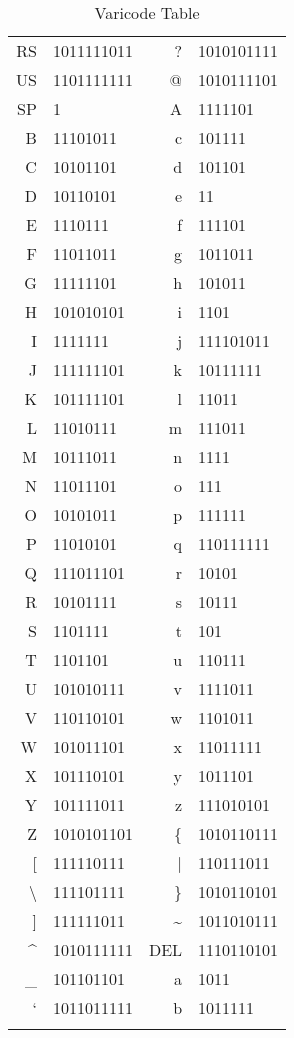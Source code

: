 \begin{longtable}{ r l || r l }
	RS  & 1011111011 				&	?   & 1010101111  \\
	US  & 1101111111 				&	@   & 1010111101  \\
	SP  & 1 						&	A   & 1111101  \\
	B   & 11101011 					&	c   & 101111  \\
	C   & 10101101 					&	d   & 101101  \\
	D   & 10110101 					&	e   & 11  \\
	E   & 1110111 					&	f   & 111101  \\
	F   & 11011011 					&	g   & 1011011  \\
	G   & 11111101 					&	h   & 101011  \\
	H   & 101010101 				&	i   & 1101  \\
	I   & 1111111 					&	j   & 111101011  \\
	J   & 111111101 				&	k   & 10111111  \\
	K   & 101111101 				&	l   & 11011  \\
	L   & 11010111 					&	m   & 111011  \\
	M   & 10111011 					&	n   & 1111  \\
	N   & 11011101 					&	o   & 111  \\
	O   & 10101011 					&	p   & 111111  \\
	P   & 11010101 					&	q   & 110111111  \\
	Q   & 111011101 				&	r   & 10101  \\
	R   & 10101111 					&	s   & 10111  \\
	S   & 1101111 					&	t   & 101  \\
	T   & 1101101 					&	u   & 110111  \\
	U   & 101010111 				&	v   & 1111011  \\
	V   & 110110101 				&	w   & 1101011  \\
	W   & 101011101 				&	x   & 11011111  \\
	X   & 101110101 				&	y   & 1011101  \\
	Y   & 101111011 				&	z   & 111010101  \\
	Z   & 1010101101 				&	\{   & 1010110111  \\
	{[}   & 111110111 				&	|   & 110111011  \\
	\textbackslash  & 111101111 	& 	\}   & 1010110101  \\
	{]}   & 111111011 				&	\textasciitilde   & 1011010111  \\
	\textasciicircum   & 1010111111 &	DEL & 1110110101\\
	\_   & 101101101 				&	a   & 1011  \\
	`   & 1011011111 				&	b   & 1011111  \\\hline
	\caption{Varicode Table}
	\label{tab:psk31_varicode}
\end{longtable}

